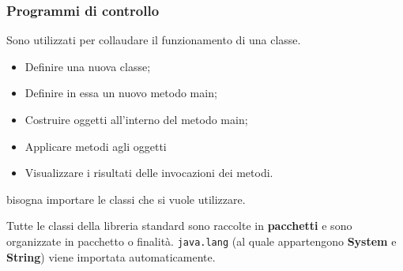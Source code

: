 \begin{frame}
\frametitle{Programmi di controllo}
Sono utilizzati per collaudare il funzionamento di una classe.
\begin{itemize}
\item Definire una nuova classe;
\item Definire in essa un nuovo metodo main;
\item Costruire oggetti all'interno del metodo main;
\item Applicare metodi agli oggetti
\item Visualizzare i risultati delle invocazioni dei metodi.
\end{itemize}
\alert bisogna importare le classi che si vuole utilizzare.

\begin{block}{}
Tutte le classi della libreria standard sono raccolte in \textbf{pacchetti} e sono organizzate in pacchetto o finalità. 
\texttt{java.lang} (al quale appartengono \textbf{System} e \textbf{String}) viene importata automaticamente.
\end{block}

\end{frame}